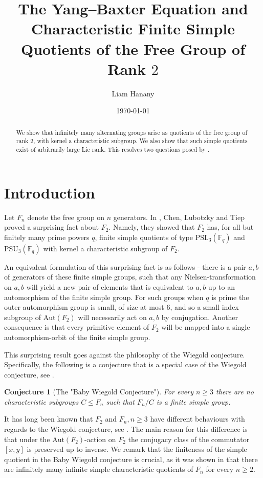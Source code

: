 \documentclass[letterpaper]{amsart}
\title[The Yang--Baxter Equation and Characteristic Finite Simple Quotients of $F_2$]{The Yang--Baxter Equation and Characteristic Finite Simple Quotients of the Free Group of Rank $2$}
\author{Liam Hanany}
\date{\today}
\newtheorem{conjecture}[theorem]{Conjecture}
\begin{document}
\begin{abstract}
We show that infinitely many alternating groups arise as quotients of the free group of rank 2, with kernel a characteristic subgroup. We also show that such simple quotients exist of arbitrarily large Lie rank. This resolves two questions posed by \cite{chen2025finite}.
\end{abstract}
\maketitle
\section{Introduction}
Let $F_n$ denote the free group on $n$ generators. In \cite{chen2025finite}, Chen, Lubotzky and Tiep proved a surprising fact about $F_2$. Namely, they showed that $F_2$ has, for all but finitely many prime powers $q$, finite simple quotients of type $\mathrm{PSL}_3(\mathbb{F}_q)$ and $\mathrm{PSU}_3(\mathbb{F}_q)$ with kernel a characteristic subgroup of $F_2$.

An equivalent formulation of this surprising fact is as follows - there is a pair $a,b$ of generators of these finite simple groups, such that any Nielsen-transformation on $a,b$ will yield a new pair of elements that is equivalent to $a,b$ up to an automorphism of the finite simple group. For such groups when $q$ is prime the outer automorphism group is small, of size at most $6$, and so a small index subgroup of $\mathrm{Aut}(F_2)$ will necessarily act on $a,b$ by conjugation. Another consequence is that every primitive element of $F_2$ will be mapped into a single automorphism-orbit of the finite simple group. 

This surprising result goes against the philosophy of the Wiegold conjecture. Specifically, the following is a conjecture that is a special case of the Wiegold conjecture, see \cite[Section 6]{lubotzky2011dynamics}.
\begin{conjecture}[The "Baby Wiegold Conjecture"]
    For every $n \geq 3$ there are no characteristic subgroups $C \leq F_n$ such that $F_n / C$ is a finite simple group.
\end{conjecture}
It has long been known that $F_2$ and $F_n, n\geq 3$ have different behaviours with regards to the Wiegold conjecture, see \cite{garion2009commutator}. The main reason for this difference is that under the $\mathrm{Aut}(F_2)$-action on $F_2$ the conjugacy class of the commutator $[x,y]$ is preserved up to inverse.
We remark that the finiteness of the simple quotient in the Baby Wiegold conjecture is crucial, as it was shown in \cite{coulon2023infinite} that there are infinitely many infinite simple characteristic quotients of $F_n$ for every $n \geq 2$.
\end{document}
